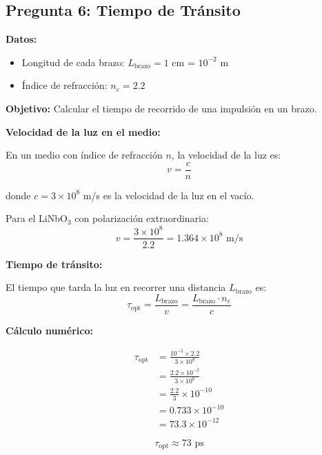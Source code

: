 \documentclass[12pt,a4paper]{article}
\begin{document}
\begin{enumerate}
\subsection{Pregunta 6: Tiempo de Tránsito}

\textbf{Datos:}
\begin{itemize}
    \item Longitud de cada brazo: $L_{\text{brazo}} = 1$ cm = $10^{-2}$ m
    \item Índice de refracción: $n_e = 2.2$
\end{itemize}

\textbf{Objetivo:} Calcular el tiempo de recorrido de una impulsión en un brazo.

\textbf{Velocidad de la luz en el medio:}

En un medio con índice de refracción $n$, la velocidad de la luz es:
\begin{equation}
    v = \frac{c}{n}
\end{equation}

donde $c = 3 \times 10^8$ m/s es la velocidad de la luz en el vacío.

Para el LiNbO$_3$ con polarización extraordinaria:
\begin{equation}
    v = \frac{3 \times 10^8}{2.2} = 1.364 \times 10^8 \text{ m/s}
\end{equation}

\textbf{Tiempo de tránsito:}

El tiempo que tarda la luz en recorrer una distancia $L_{\text{brazo}}$ es:
\begin{equation}
    \tau_{\text{opt}} = \frac{L_{\text{brazo}}}{v} = \frac{L_{\text{brazo}} \cdot n_e}{c}
\end{equation}

\textbf{Cálculo numérico:}

\begin{align}
    \tau_{\text{opt}} &= \frac{10^{-2} \times 2.2}{3 \times 10^8} \\
    &= \frac{2.2 \times 10^{-2}}{3 \times 10^8} \\
    &= \frac{2.2}{3} \times 10^{-10} \\
    &= 0.733 \times 10^{-10} \\
    &= 73.3 \times 10^{-12}
\end{align}

\begin{equation}
    \boxed{\tau_{\text{opt}} \approx 73 \text{ ps}}
\end{equation}


\end{enumerate}
\end{document}
